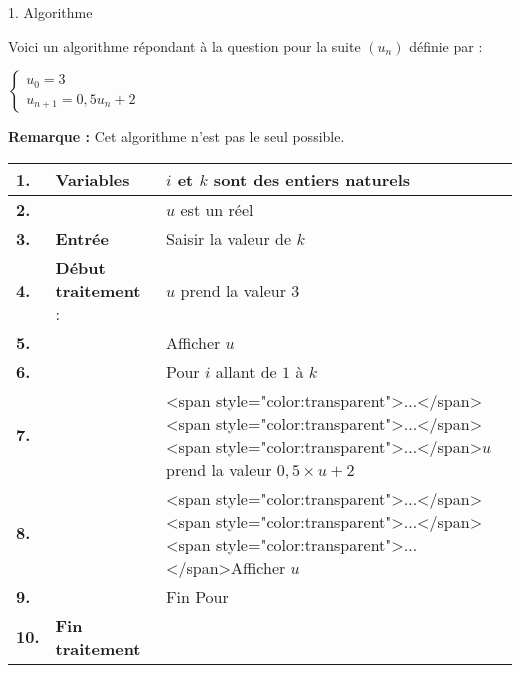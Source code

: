 
%
\begin{h3}1. Algorithme\end{h3}
Voici un algorithme répondant à la question pour la suite $\left(u_{n}\right)$ définie par :
\par
$\left\{ \begin{matrix} u_{0}=3 \\ u_{n+1} = 0,5u_{n}+2\end{matrix}\right.$
\par
     \textbf{Remarque : }Cet algorithme n'est pas le seul possible.
    \begin{tabularx}{0.8\linewidth}{|*{3}{>{\centering \arraybackslash }X|}}%
          \hline
          \textbf{ 1.} & \textbf{Variables}  &  	$i$ et $k$ sont des entiers naturels
          \\ \hline
          \textbf{ 2.} &  & $u$ est un réel
          \\ \hline
          \textbf{ 3.} & \textbf{Entrée}  & Saisir la valeur de $k$
          \\ \hline
          \textbf{ 4.} & \textbf{Début traitement} : &  	$u$ prend la valeur 3
          \\ \hline
          \textbf{ 5.} &  & Afficher $u$
               \\ \hline
               \textbf{ 6.} &   & Pour $i$ allant de $1$ à $k$
               \\ \hline
               \textbf{ 7.} &  & <span style="color:transparent">...</span><span style="color:transparent">...</span><span style="color:transparent">...</span>$u$ prend la valeur $0,5\times u+2$
               \\ \hline
               \textbf{ 8.} &  & <span style="color:transparent">...</span><span style="color:transparent">...</span><span style="color:transparent">...</span>Afficher $u$
               \\ \hline
               \textbf{ 9.} &  &  Fin Pour
               \\ \hline
               \textbf{10.} & \textbf{Fin traitement}  &
               \\ \hline
          \end{tabularx}
